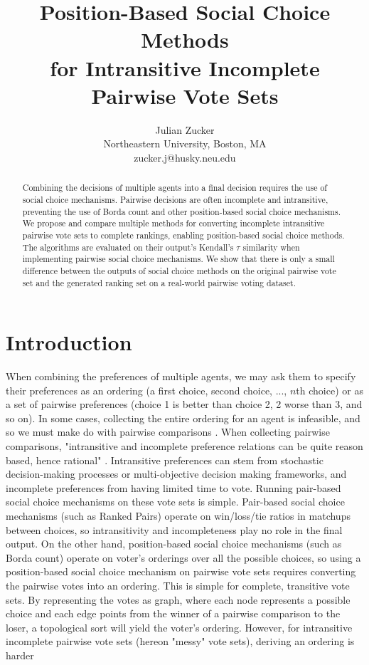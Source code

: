 \documentclass[letterpaper]{article} %
\title{Position-Based Social Choice Methods \\for Intransitive Incomplete Pairwise Vote Sets}
\author{Julian Zucker\\ %
Northeastern University, Boston, MA\\
zucker.j@husky.neu.edu}
\begin{document}
\maketitle

\begin{abstract}
Combining the decisions of multiple agents into a final decision requires the use of social choice mechanisms. Pairwise decisions are often incomplete and intransitive, preventing the use of Borda count and other position-based social choice mechanisms. We propose and compare multiple methods for converting incomplete intransitive pairwise vote sets to complete rankings, enabling position-based social choice methods.  The algorithms are evaluated on their output’s Kendall's $\tau$ similarity when implementing pairwise social choice mechanisms. We show that there is only a small difference between the outputs of social choice methods on the original pairwise vote set and the generated ranking set on a real-world pairwise voting dataset.
\end{abstract}

\section{Introduction}
When combining the preferences of multiple agents, we may ask them to specify their preferences as an ordering (a first choice, second choice, ..., $n$th choice) or as a set of pairwise preferences (choice 1 is better than choice 2, 2 worse than 3, and so on). In some cases, collecting the entire ordering for an agent is infeasible, and so we must make do with pairwise comparisons \cite{Saaty2008}. When collecting pairwise comparisons, "intransitive and incomplete preference relations can be quite reason based, hence rational" \cite{Nurmi2014}. Intransitive preferences can stem from stochastic decision-making processes or multi-objective decision making frameworks, and incomplete preferences from having limited time to vote. Running pair-based social choice mechanisms on these vote sets is simple. Pair-based social choice mechanisms (such as Ranked Pairs) operate on win/loss/tie ratios in matchups between choices, so intransitivity and incompleteness play no role in the final output. On the other hand, position-based social choice mechanisms (such as Borda count) operate on voter's orderings over all the possible choices, so using a position-based social choice mechanism on pairwise vote sets requires converting the pairwise votes into an ordering. This is simple for complete, transitive vote sets. By representing the votes as graph, where each node represents a possible choice and each edge points from the winner of a pairwise comparison to the loser, a topological sort will yield the voter's ordering. However, for intransitive incomplete pairwise vote sets (hereon "messy" vote sets), deriving an ordering is harder
\end{document}
